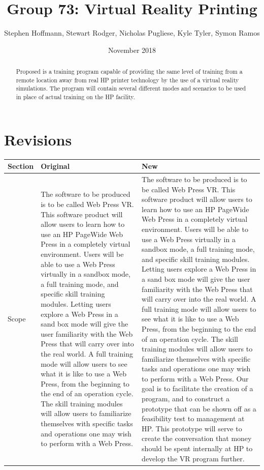 \documentclass[onecolumn, draftclsnofoot,10pt, compsoc]{IEEEtran}
\title{Group 73: Virtual Reality Printing}
\author{Stephen Hoffmann, Stewart Rodger, Nicholas Pugliese, Kyle Tyler, Symon Ramos}
\date{November 2018}
\begin{document}
\maketitle
    \begin{abstract}
        Proposed is a training program capable of providing the same level of training from a remote location away from real HP printer technology by the use of a virtual reality simulations. The program will contain several different modes and scenarios to be used in place of actual training on the HP facility.
    \end{abstract}
\newpage
{}
\tableofcontents

\section*{Revisions}

\begin{table}[ht!]
\begin{tabularx}{\textwidth}{|l|X|X|}
\hline
\rowcolor[HTML]{C0C0C0} 
Section & Original & New \\ \hline
Scope &     The software to be produced is to be called Web Press VR. This software product will allow users to learn how to use
an HP PageWide Web Press in a completely virtual environment. Users will be able to use a Web Press virtually in a
sandbox mode, a full training mode, and specific skill training modules. Letting users explore a Web Press in a sand
box mode will give the user familiarity with the Web Press that will carry over into the real world. A full training mode
will allow users to see what it is like to use a Web Press, from the beginning to the end of an operation cycle. The skill
training modules will allow users to familiarize themselves with specific tasks and operations one may wish to perform
with a Web Press.     &   The software to be produced is to be called Web Press VR. This software product will allow users to learn how to use
an HP PageWide Web Press in a completely virtual environment. Users will be able to use a Web Press virtually in a
sandbox mode, a full training mode, and specific skill training modules. Letting users explore a Web Press in a sand
box mode will give the user familiarity with the Web Press that will carry over into the real world. A full training mode
will allow users to see what it is like to use a Web Press, from the beginning to the end of an operation cycle. The skill
training modules will allow users to familiarize themselves with specific tasks and operations one may wish to perform
with a Web Press. Our goal is to facilitate the creation of a program, and to construct a prototype that can be shown off as a feasibility test to management at HP. This prototype will serve to create the conversation that money should be spent internally at HP to develop the VR program further.  \\ \hline
\end{tabularx}
\end{table}
\end{document}
